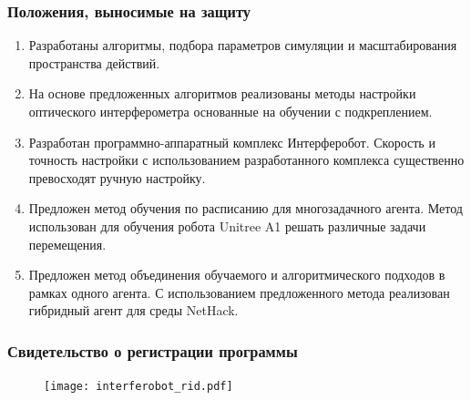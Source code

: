 \begin{frame}
\frametitle{Положения, выносимые на защиту}
\begin{enumerate}
  \item Разработаны алгоритмы, подбора параметров симуляции и масштабирования пространства действий. 
  \item На основе предложенных алгоритмов реализованы методы настройки оптического интерферометра основанные на обучении с подкреплением.
  \item Разработан программно-аппаратный комплекс Интерферобот. Скорость и точность настройки с использованием разработанного комплекса существенно превосходят ручную настройку.
  \item Предложен метод обучения по расписанию для многозадачного агента. Метод использован для обучения робота Unitree A1 решать различные задачи перемещения. 
  \item Предложен метод объединения обучаемого и алгоритмического подходов в рамках одного агента. С использованием предложенного метода реализован гибридный агент для среды NetHack.
    \end{enumerate}
\end{frame}

\begin{frame}
    \frametitle{Свидетельство о регистрации программы}
    \begin{figure}[h]
        \centering
        \texttt{[image: interferobot\_rid.pdf]}
    \end{figure}
\end{frame}


